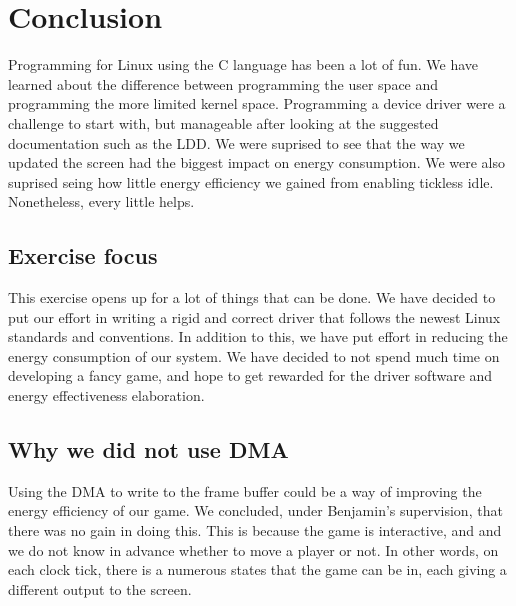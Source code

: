 \section{Conclusion}
Programming for Linux using the C language has been a lot of fun. We have learned about the difference between programming the user space and programming the more limited kernel space. Programming a device driver were a challenge to start with, but manageable after looking at the suggested documentation such as the LDD. We were suprised to see that the way we updated the screen had the biggest impact on energy consumption. We were also suprised seing how little energy efficiency we gained from enabling tickless idle. Nonetheless, every little helps. 

\subsection{Exercise focus}
This exercise opens up for a lot of things that can be done. We have decided to put our effort in writing a rigid and correct driver that follows the newest Linux standards and conventions. In addition to this, we have put effort in reducing the energy consumption of our system. We have decided to not spend much time on developing a fancy game, and hope to get rewarded for the driver software and energy effectiveness elaboration. 

\subsection{Why we did not use DMA}
Using the DMA to write to the frame buffer could be a way of improving the energy efficiency of our game. We concluded, under Benjamin's supervision, that there was no gain in doing this. This is because the game is interactive, and and we do not know in advance whether to move a player or not. In other words, on each clock tick, there is a numerous states that the game can be in, each giving a different output to the screen.
